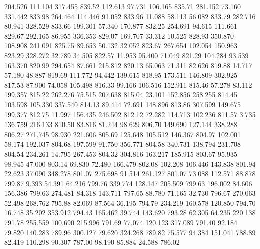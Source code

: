  204.526  111.104  317.455       839.52
 112.613   97.731  106.165       835.71
 281.152   73.160  331.442       833.98
 264.464  114.446   91.052       833.96
  11.088   58.113   56.082       833.79
 282.716   80.941  328.529       833.66
 199.301   57.340  170.877       832.25
 254.691   94.615  111.661       829.67
 292.165   86.955  336.353       829.07
 169.707   33.312   10.525       828.93
 350.870  108.908  241.091       825.75
  89.653   50.132   32.052       823.67
 267.654  102.054  150.963       823.29
 328.272   32.789   34.505       822.57
  11.953   95.400   71.049       821.29
 104.284   93.539  163.370       820.99
 294.654   87.661  215.812       820.13
  65.063   71.311   82.626       819.88
  14.717   57.180   48.887       819.69
 111.772   94.442  139.615       818.95
 173.511  146.809  302.925       817.53
  87.900   74.058  105.498       816.33
  99.166  106.516  152.911       815.46
  57.278   83.112  199.357       815.22
 262.276   75.515  207.638       815.04
  23.101  152.856  258.255       814.45
 103.598  105.330  337.540       814.13
  89.414   72.691  148.896       813.86
 307.599  149.675  199.377       812.75
  11.997  156.435  246.502       812.12
  72.282  114.713  102.236       811.57
   3.735  136.759  216.133       810.50
  83.816   81.244   98.629       806.70
 149.690  127.144  338.288       806.27
 271.745   98.930  221.606       805.69
 125.648  105.512  146.367       804.97
 102.001   58.174  192.037       804.68
 197.599   91.750  356.771       804.58
 340.731  138.794  231.708       804.54
 234.261   14.795  267.453       804.32
 304.816  163.217  185.915       803.67
  95.935   98.945   47.000       803.14
  69.830   72.480  166.479       802.08
 102.208  106.446  143.838       801.94
  22.623   37.090  348.278       801.07
 275.698   91.514  261.127       801.07
  73.088  112.571   88.878       799.87
   9.393   54.391   64.216       799.76
 339.774  128.147  205.509       799.63
 196.002   84.606  156.386       799.63
 274.481   84.318  143.711       797.65
  88.780   71.165   32.730       796.67
 270.063   52.498  268.762       795.88
  82.069   87.564   36.195       794.79
 234.219  160.578  120.850       794.70
  16.748   35.202  353.912       794.43
 165.462   39.744  143.620       793.28
  62.305   64.235  220.138       791.78
 255.559  100.690  215.996       791.69
  77.074  120.123  317.089       791.40
  92.184   79.820  140.283       789.96
 300.127   79.620  324.268       789.82
  75.577   94.384  151.041       788.89
  82.419  110.298   90.307       787.00
  98.190   85.884   24.588       786.02
